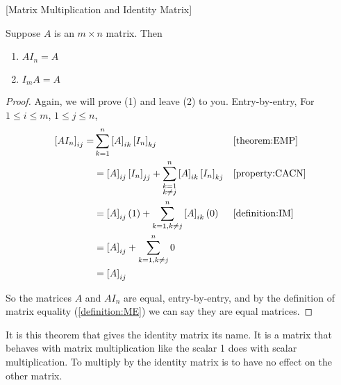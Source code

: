 \documentclass{ximera}
\begin{document}
\begin{theorem}
  \label{theorem:MMIM}
  [Matrix Multiplication and Identity Matrix]
  
  Suppose $A$ is an $m\times n$ matrix.  Then
  \begin{enumerate}
  \item $AI_n=A$
  \item $I_mA=A$
  \end{enumerate}

  \begin{proof}
    Again, we will prove (1) and leave (2) to you.  Entry-by-entry,    For $1\leq i\leq m$, $1\leq j\leq n$,
    \begin{align*}
      \left\lbrack AI_n\right\rbrack_{ij}=&
                               \sum_{k=1}^{n}\left\lbrack A\right\rbrack_{ik}\left\lbrack I_n\right\rbrack_{kj}
      &&\ref{theorem:EMP}\\
                             &=\left\lbrack A\right\rbrack_{ij}\left\lbrack I_n\right\rbrack_{jj}+\sum_{\substack{k=1\\k\neq j}}^{n}\left\lbrack A\right\rbrack_{ik}\left\lbrack I_n\right\rbrack_{kj}
                             &&\ref{property:CACN}\\
                             &=\left\lbrack A\right\rbrack_{ij}(1)+\sum_{k=1, k\neq j}^{n}\left\lbrack A\right\rbrack_{ik}(0)
      &&\ref{definition:IM}\\
                             &=\left\lbrack A\right\rbrack_{ij}+\sum_{k=1, k\neq j}^{n}0\\
                             &=\left\lbrack A\right\rbrack_{ij}
    \end{align*}
    
    So the matrices $A$ and $AI_n$ are equal, entry-by-entry, and by the definition of matrix equality (\ref{definition:ME}) we can say they are equal matrices.

\end{proof}
\end{theorem}

It is this theorem that gives the identity matrix its name.  It is a
matrix that behaves with matrix multiplication like the scalar 1 does
with scalar multiplication.  To multiply by the identity matrix is to
have no effect on the other matrix.
\end{document}

